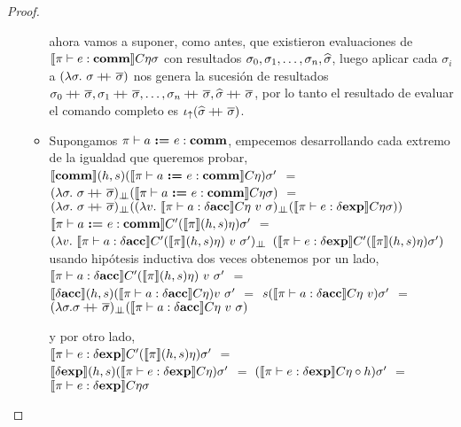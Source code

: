 \begin{proof}
\begin{itemize}
\begin{itemize}
ahora vamos a suponer, como antes, que existieron evaluaciones de 
$\llbracket \pi \vdash e : \textbf{comm} \rrbracket C \eta \sigma$
con resultados $\sigma_0, \sigma_1, \ldots, \sigma_n, \widehat{\sigma}$, luego
aplicar cada $\sigma_i$ a $(\lambda \sigma . \ \sigma +\kern-1.3ex+\kern0.8ex \overline{\sigma})$ nos
genera la sucesi\'on de resultados 
$\sigma_0\concat\sigmaover, \sigma_1\concat\sigmaover, \ldots, 
\sigma_n\concat\sigmaover, \sigmahat\concat\sigmaover$, por lo tanto el resultado
de evaluar el comando completo es $\iota_{\uparrow} (\widehat{\sigma}+\kern-1.3ex+\kern0.8ex\overline{\sigma})$.

\item Supongamos $\pi \vdash a \ \textbf{:=} \ e : \textbf{comm}$, empecemos desarrollando cada
extremo de la igualdad que queremos probar,\\

$\llbracket \textbf{comm} \rrbracket(h,s)(\llbracket \pi \vdash a \ \textbf{:=} \ e : \textbf{comm} \rrbracket C\eta)\sigma'$ $=$\\
$(\lambda \sigma. \ \sigma +\kern-1.3ex+\kern0.8ex \overline{\sigma})_{\bot \!\!\! \bot}
				(\llbracket \pi \vdash a \ \textbf{:=} \ e : \textbf{comm} \rrbracket C\eta\sigma)$ $=$\\
$(\lambda \sigma. \ \sigma \concat \sigmaover)_{\dbot}(
	(\lambda v. \ \semBrcks{\pi \vdash a : \deltaacc}C\eta \ v \ \sigma)_{\dbot}
	(\semBrcks{\pi \vdash e : \deltaexp}C\eta\sigma))$\\
	
$\llbracket \pi \vdash a \ \textbf{:=} \ e : \textbf{comm} \rrbracket C'(\llbracket \pi \rrbracket(h,s)\eta)\sigma'$ $=$\\
$(\lambda v. \ 
	\semBrcks{\pi \vdash a : \deltaacc}C'(\semBrcks{\pi}(h,s)\eta)\ v \ \sigma')_{\dbot}$
$(\llbracket \pi \vdash e : \delta \textbf{exp} \rrbracket C'(\llbracket \pi \rrbracket(h,s)\eta)\sigma')$ \\

usando hip\'otesis inductiva dos veces obtenemos por un lado,\\

$\llbracket \pi \vdash a : \delta \textbf{acc} \rrbracket C'(\llbracket \pi \rrbracket(h,s)\eta)\ v \ \sigma'$ $=$\\
$\llbracket \delta \textbf{acc} \rrbracket(h,s)(\llbracket \pi \vdash a : \delta \textbf{acc} \rrbracket C\eta) v \ \sigma'$ $=$
$s(\llbracket \pi \vdash a : \delta \textbf{acc} \rrbracket C \eta \ v)\sigma'$ $=$\\
$(\lambda \sigma . \sigma \concat \sigmaover)_{\dbot}
				(\semBrcks{\pi \vdash a : \deltaacc} C \eta \ v \ \sigma)$
				
y por otro lado,\\

$\llbracket \pi \vdash e : \delta \textbf{exp} \rrbracket C'(\llbracket \pi \rrbracket(h,s)\eta)\sigma'$ $=$\\
$\llbracket \delta \textbf{exp} \rrbracket(h,s)(\llbracket \pi \vdash e : \delta \textbf{exp} \rrbracket C \eta)\sigma'$ $=$
$(\llbracket \pi \vdash e : \delta \textbf{exp} \rrbracket C \eta \circ h)\sigma'$ $=$\\
$\llbracket \pi \vdash e : \delta \textbf{exp} \rrbracket C \eta \sigma$\\


\end{itemize}
\end{itemize}
\end{proof}
